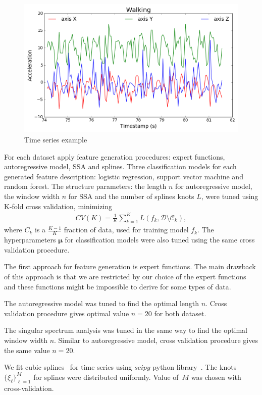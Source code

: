 \documentclass{llncs}
\begin{document}
\begin{figure}[h]
	\centering
	\includegraphics[width=1\linewidth]{ts_example.png}
	\caption{Time series example}
	\label{fig::ts_example}
\end{figure}

For each dataset apply feature generation procedures: expert functions, autoregressive model, SSA and splines. 
Three classification models for each generated feature description: logistic regression, support vector machine and random forest. 
The structure parameters: the length $n$ for autoregressive model, the window width $n$ for SSA and the number of splines knots $L$, were tuned using K-fold cross validation, minimizing
\begin{align}\label{cv}
CV(K) = \frac{1}{K}\sum_{k=1}^{K} L(f_k, \mathcal{D}\setminus \mathcal{C}_k),
\end{align}
where $C_k$ is a $\frac{K-1}{K}$ fraction of data, used for training model $f_k$.
The hyperparameters $\bm{\mu}$ for classification models were also tuned using the same cross validation procedure. 


The first approach for feature generation is expert functions. The main drawback of this approach is that we are restricted by our choice of the expert functions and these functions might be impossible to derive for some types of data.

The autoregressive model was tuned to find the optimal length $n$. Cross validation procedure gives optimal value $n=20$ for both dataset. 

The singular spectrum analysis was tuned in the same way to find the optimal window width $n$. Similar to autoregressive model, cross validation procedure gives the same value $n=20$.

We fit cubic splines~\cite{deboor1978splines} for time series using $scipy$ python library~\cite{scipy}. 
The knots $\{\xi_{\ell}\}_{\ell = 1}^M$ for splines were distributed uniformly. 
Value of~$M$ was chosen with cross-validation. 
\end{document}
